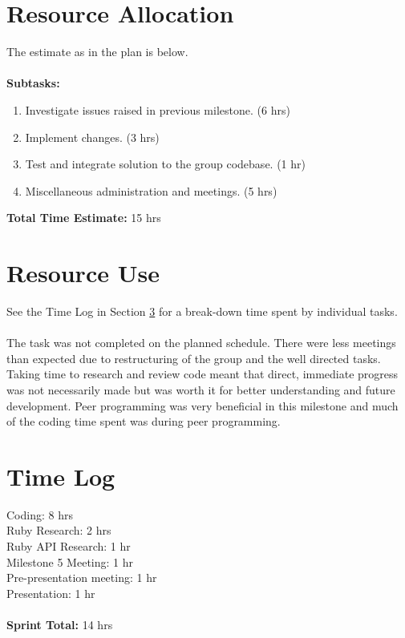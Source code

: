 \documentclass[10pt, a4]{article}
\begin{document}
\section{Resource Allocation}
The estimate as in the plan is below.\\
\\
\textbf{Subtasks:}
\begin{enumerate}
	\item Investigate issues raised in previous milestone. (6 hrs)
	\item Implement changes. (3 hrs)
	\item Test and integrate solution to the group codebase. (1 hr)
	\item Miscellaneous administration and meetings. (5 hrs)
\end{enumerate}
\textbf{Total Time Estimate:} 15 hrs

\section{Resource Use}
See the Time Log in Section \ref{time-log} for a break-down time spent by individual tasks.\\
\\
The task was not completed on the planned schedule. There were less meetings than expected due to restructuring of the group and the well directed tasks. Taking time to research and review code meant that direct, immediate progress was not necessarily made but was worth it for better understanding and future development. Peer programming was very beneficial in this milestone and much of the coding time spent was during peer programming.

\section{Time Log}
\label{time-log}
Coding: 8 hrs\\
Ruby Research: 2 hrs\\
Ruby API Research: 1 hr\\
Milestone 5 Meeting: 1 hr\\
Pre-presentation meeting: 1 hr\\
Presentation: 1 hr\\
\\
\textbf{Sprint Total:} 14 hrs%
\end{document}
